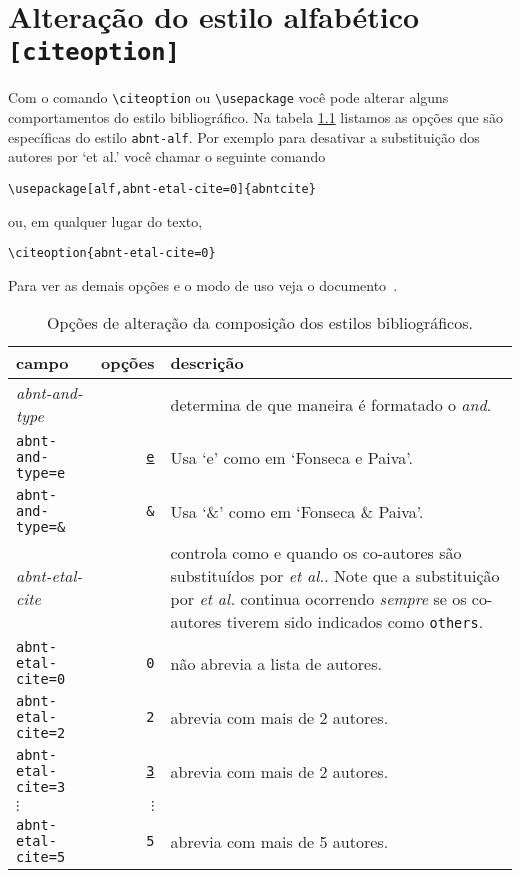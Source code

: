 \documentclass[espacosimples]{abnt}
\begin{document}
\chapter{Alteração do estilo alfabético {\tt [citeoption]}}

Com o comando \verb+\citeoption+ ou \verb+\usepackage+ você pode alterar alguns comportamentos
do estilo bibliográfico. Na tabela \ref{tabela-opcoes} listamos as
opções que são específicas do estilo {\tt abnt-alf}. 
Por exemplo para desativar a substituição dos autores por `et al.'
você chamar o seguinte comando
\begin{verbatim}
\usepackage[alf,abnt-etal-cite=0]{abntcite}
\end{verbatim}
ou, em qualquer lugar do texto,
\begin{verbatim}
\citeoption{abnt-etal-cite=0}
\end{verbatim}
Para ver as demais
opções e o modo de uso veja o documento~\cite{abnt-bibtex-doc}.

\begin{table}[htbp]
\begin{center}
\begin{tabular}{lrp{8cm}}\hline\hline
campo & opções & descrição \\ \hline
\emph{abnt-and-type} & & determina de que maneira é formatado o \emph{and}.\\
{\tt abnt-and-type=e} & \underline{\tt e}& Usa `e' como em `Fonseca e Paiva'.\\
{\tt abnt-and-type=\&} & {\tt \&} & Usa `\&' como em `Fonseca \& Paiva'.
\\ \hline
\emph{abnt-etal-cite} &  & controla como e quando os co-autores são
substituídos por \emph{et al.}.  Note que a substituição
por \emph{et al.} continua ocorrendo \emph{sempre} se os co-autores tiverem sido indicados
como {\tt others}.\\
{\tt abnt-etal-cite=0}&{\tt 0}& não abrevia a lista de autores.\\
{\tt abnt-etal-cite=2}& {\tt 2} & abrevia com mais de 2 autores.\\
{\tt abnt-etal-cite=3}& \underline{\tt 3} & abrevia com mais de 2 autores.\\
$\vdots$ & $\vdots$ & \\
{\tt abnt-etal-cite=5}& {\tt 5} & abrevia com mais de 5 autores.
\\ \hline\hline
\end{tabular}
\end{center}
\caption[Opções de alteração dos estilos bibliográficos: composição]{
Opções de alteração da composição dos estilos bibliográficos.}
\label{tabela-opcoes}
\end{table}
\end{document}
